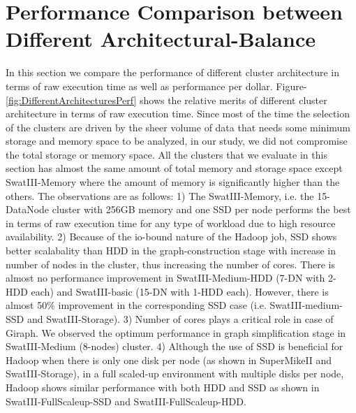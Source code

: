\documentclass[conference]{IEEEtran}
\begin{document}
\section {Performance Comparison between Different Architectural-Balance} \label{ComparingDifferentArchitecturalBalance}
In this section we compare the performance of different cluster architecture in terms of raw execution time as well as performance per dollar.
Figure-\ref{fig:DifferentArchitecturesPerf} shows the relative merits of different cluster architecture in terms of raw execution time.
Since most of the time the selection of the clusters are driven by the sheer volume of data that needs some minimum storage and memory space to be analyzed, in our study, we did not compromise the total storage or memory space. All the clusters that we evaluate in this section has almost the same amount of total memory and storage space except SwatIII-Memory where the amount of memory is significantly higher than the others.
The observations are as follows:
1) The SwatIII-Memory, i.e. the 15-DataNode cluster with 256GB memory and one SSD per node performs the best in terms of raw execution time for any type of workload due to high resource availability.
2) Because of the io-bound nature of the Hadoop job, SSD shows better scalabality than HDD in the graph-construction stage with increase in number of nodes in the cluster, thus increasing the number of cores. There is almost no performance improvement in SwatIII-Medium-HDD (7-DN with 2-HDD each) and SwatIII-basic (15-DN with 1-HDD each). However, there is almost 50\% improvement in the corresponding SSD case (i.e. SwatIII-medium-SSD and SwatIII-Storage).
3) Number of cores plays a critical role in case of Giraph. We observed the optimum performance in graph simplification stage in SwatIII-Medium (8-nodes) cluster.
4) Although the use of SSD is beneficial for Hadoop when there is only one disk per node (as shown in SuperMikeII and SwatIII-Storage), in a full scaled-up environment with multiple disks per node, Hadoop shows similar performance with both HDD and SSD as shown in SwatIII-FullScaleup-SSD and SwatIII-FullScaleup-HDD.
\end{document}
